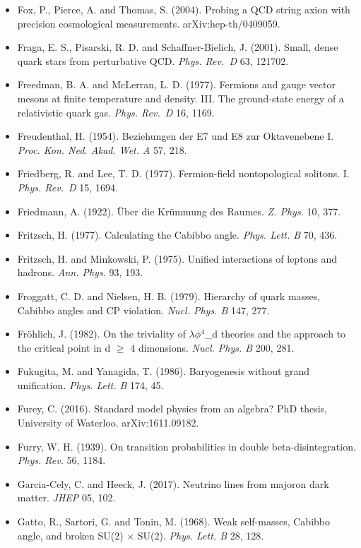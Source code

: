 \documentclass[
  11pt,
]{article}
\begin{document}
\begin{itemize}
  Foot, R. (1994). A note on Koide's lepton mass relation. arXiv:hep-ph/9402242.
\item
  Fox, P., Pierce, A. and Thomas, S. (2004). Probing a QCD string axion with precision cosmological measurements. arXiv:hep-th/0409059.
\item
  Fraga, E. S., Pisarski, R. D. and Schaffner-Bielich, J. (2001). Small, dense quark stars from perturbative QCD. \emph{Phys. Rev.~D} 63, 121702.
\item
  Freedman, B. A. and McLerran, L. D. (1977). Fermions and gauge vector mesons at finite temperature and density. III. The ground-state energy of a relativistic quark gas. \emph{Phys. Rev.~D} 16, 1169.
\item
  Freudenthal, H. (1954). Beziehungen der E7 und E8 zur Oktavenebene I. \emph{Proc. Kon. Ned. Akad. Wet. A} 57, 218.
\item
  Friedberg, R. and Lee, T. D. (1977). Fermion-field nontopological solitons. I. \emph{Phys. Rev.~D} 15, 1694.
\item
  Friedmann, A. (1922). Über die Krümmung des Raumes. \emph{Z. Phys.} 10, 377.
\item
  Fritzsch, H. (1977). Calculating the Cabibbo angle. \emph{Phys. Lett. B} 70, 436.
\item
  Fritzsch, H. and Minkowski, P. (1975). Unified interactions of leptons and hadrons. \emph{Ann. Phys.} 93, 193.
\item
  Froggatt, C. D. and Nielsen, H. B. (1979). Hierarchy of quark masses, Cabibbo angles and CP violation. \emph{Nucl. Phys. B} 147, 277.
\item
  Fröhlich, J. (1982). On the triviality of \ensuremath{\lambda}\ensuremath{\phi}\ensuremath{^{4}}\_d theories and the approach to the critical point in d \ensuremath{\ge} 4 dimensions. \emph{Nucl. Phys. B} 200, 281.
\item
  Fukugita, M. and Yanagida, T. (1986). Baryogenesis without grand unification. \emph{Phys. Lett. B} 174, 45.
\item
  Furey, C. (2016). Standard model physics from an algebra? PhD thesis, University of Waterloo. arXiv:1611.09182.
\item
  Furry, W. H. (1939). On transition probabilities in double beta-disintegration. \emph{Phys. Rev.} 56, 1184.
\item
  Garcia-Cely, C. and Heeck, J. (2017). Neutrino lines from majoron dark matter. \emph{JHEP} 05, 102.
\item
  Gatto, R., Sartori, G. and Tonin, M. (1968). Weak self-masses, Cabibbo angle, and broken SU(2) \ensuremath{\times} SU(2). \emph{Phys. Lett. B} 28, 128.

\end{itemize}
\end{document}
